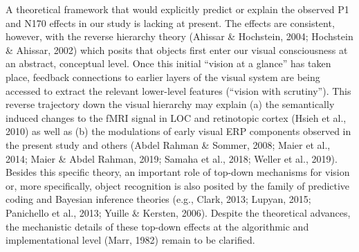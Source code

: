 \documentclass[
  english,
  man,floatsintext]{apa7}
\begin{document}
A theoretical framework that would explicitly predict or explain the observed P1 and N170 effects in our study is lacking at present. The effects are consistent, however, with the reverse hierarchy theory (Ahissar \& Hochstein, 2004; Hochstein \& Ahissar, 2002) which posits that objects first enter our visual consciousness at an abstract, conceptual level. Once this initial ``vision at a glance'' has taken place, feedback connections to earlier layers of the visual system are being accessed to extract the relevant lower-level features (``vision with scrutiny''). This reverse trajectory down the visual hierarchy may explain (a) the semantically induced changes to the fMRI signal in LOC and retinotopic cortex (Hsieh et al., 2010) as well as (b) the modulations of early visual ERP components observed in the present study and others (Abdel Rahman \& Sommer, 2008; Maier et al., 2014; Maier \& Abdel Rahman, 2019; Samaha et al., 2018; Weller et al., 2019). Besides this specific theory, an important role of top-down mechanisms for vision or, more specifically, object recognition is also posited by the family of predictive coding and Bayesian inference theories (e.g., Clark, 2013; Lupyan, 2015; Panichello et al., 2013; Yuille \& Kersten, 2006). Despite the theoretical advances, the mechanistic details of these top-down effects at the algorithmic and implementational level (Marr, 1982) remain to be clarified.
\end{document}
